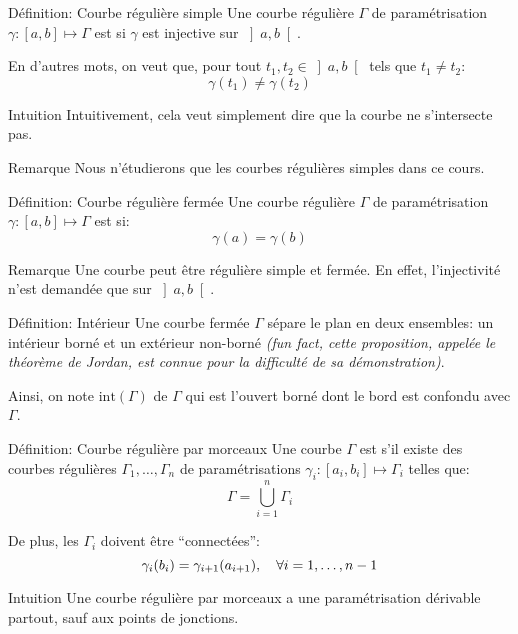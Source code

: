 \documentclass[a4paper]{article}
\begin{document}
\begin{parag}{Définition: Courbe régulière simple}
    Une courbe régulière $\Gamma$ de paramétrisation $\gamma: \left[a, b\right] \mapsto \Gamma$ est  si $\gamma$ est injective sur $\left]a, b\right[ $. 

    En d'autres mots, on veut que, pour tout $t_1, t_2 \in \left]a, b\right[$ tels que $t_1 \neq t_2$:
    \[\gamma\left(t_1\right) \neq \gamma\left(t_2\right)\]

    \begin{subparag}{Intuition}
        Intuitivement, cela veut simplement dire que la courbe ne s'intersecte pas.
    \end{subparag}

    \begin{subparag}{Remarque}
        Nous n'étudierons que les courbes régulières simples dans ce cours.
    \end{subparag}
\end{parag}

\begin{parag}{Définition: Courbe régulière fermée}
    Une courbe régulière $\Gamma$ de paramétrisation $\gamma: \left[a, b\right] \mapsto \Gamma$ est  si: 
    \[\gamma\left(a\right) = \gamma\left(b\right)\]
    
    \begin{subparag}{Remarque}
        Une courbe peut être régulière simple et fermée. En effet, l'injectivité n'est demandée que sur $\left]a, b\right[ $.
    \end{subparag}
\end{parag}

\begin{parag}{Définition: Intérieur}
    Une courbe fermée $\Gamma$ sépare le plan en deux ensembles: un intérieur borné et un extérieur non-borné \textit{(fun fact, cette proposition, appelée le théorème de Jordan, est connue pour la difficulté de sa démonstration)}.

    Ainsi, on note $\text{int}\left(\Gamma\right)$  de $\Gamma$ qui est l'ouvert borné dont le bord est confondu avec $\Gamma$. 
\end{parag}

\begin{parag}{Définition: Courbe régulière par morceaux}
    Une courbe $\Gamma$ est  s'il existe des courbes régulières $\Gamma_1, \ldots, \Gamma_n$ de paramétrisations $\gamma_i : \left[a_i, b_i\right] \mapsto \Gamma_i$ telles que: 
    \[\Gamma = \bigcup_{i=1}^{n} \Gamma_i\]
    
    De plus, les $\Gamma_i$ doivent être ``connectées'': 
    \[\gamma_i\left(b_i\right) = \gamma_{i+1}\left(a_{i+1}\right), \mathspace \forall i = 1, \ldots, n-1\]

    \begin{subparag}{Intuition}
        Une courbe régulière par morceaux a une paramétrisation dérivable partout, sauf aux points de jonctions.
    \end{subparag}
\end{parag}
\end{document}
